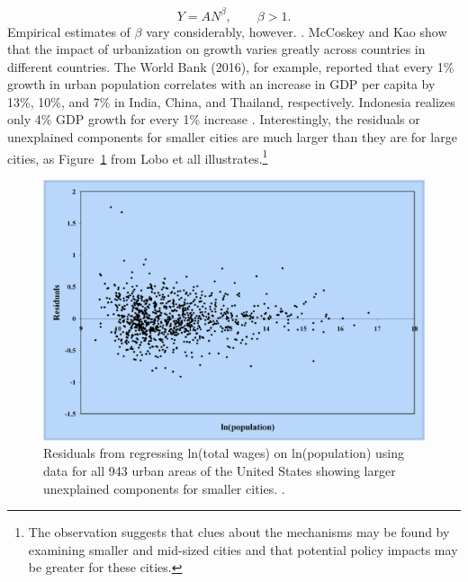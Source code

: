 \begin{equation}\label{eq-agglom-eqn2}
    Y=AN^\beta,\qquad \beta>1. 
\end{equation}
Empirical estimates of $\beta$ vary considerably, however. \cite{rosenthalEvidenceNatureSources2004, bettencourtIntroductionUrbanScience2021, loboUrbanScalingProduction2013}. McCoskey and Kao \cite{mccoskeyPanelDataInvestigation} show that the impact of urbanization on growth varies greatly across countries in different countries. The World Bank (2016), for example, reported that every 1\% growth in urban population correlates with an increase in GDP per capita by 13\%, 10\%, and 7\% in India, China, and Thailand, respectively. Indonesia realizes only 4\% GDP growth for every 1\% increase \cite{haryantotriRelationshipUrbanizationEducation2021}. Interestingly, the residuals or unexplained components for smaller cities are much larger than they are for large cities, as Figure~\ref{fig-residuals-lobo} from Lobo et all \cite{loboUrbanScalingProduction2013} illustrates.\footnote{The observation suggests that clues about the mechanisms may be found by examining smaller and mid-sized cities and that potential policy impacts may be greater for these cities.}

\begin{figure}[h!tb]
\centering
\includegraphics[scale=0.30]{fig/residuals-lobo.png}
\caption{Residuals from regressing ln(total wages) on ln(population) using data for all 943 urban areas of the United States showing larger unexplained components for smaller cities. \cite{loboUrbanScalingProduction2013}.}
\label{fig-residuals-lobo}
\end{figure}

